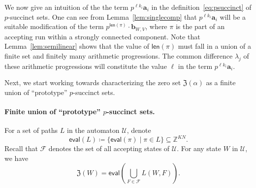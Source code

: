 \documentclass[letterpaper, 11pt, thm-restate]{article}
\numberwithin{equation}{section}
\newcommand{\Z}{\mathbb{Z}}
\newcommand{\mF}{\mathcal{F}}
\newcommand{\mZ}{\mathfrak{Z}}
\newcommand{\ba}{\boldsymbol{a}}
\newcommand{\bb}{\boldsymbol{b}}
\newcommand{\mmU}{\mathscr{U}}
\newcommand{\len}{\mathsf{len}}
\newcommand{\eval}{\mathsf{eval}}
\theoremstyle{definition}
\theoremstyle{definition}
\theoremstyle{definition}
\begin{document}
We now give an intuition of the the term $p^{\ell k_i} \ba_i$ in the definition~\eqref{eq:psuccinct} of $p$-succinct sets.
One can see from Lemma~\ref{lem:singlecomp} that $p^{\ell k_i} \ba_i$ will be a suitable modification of the term $p^{\len(\pi)} \cdot \bb_{W, V}$, where $\pi$ is the part of an accepting run within a strongly connected component.
Note that Lemma~\ref{lem:semilinear} shows that the value of $\len(\pi)$ must fall in a union of a finite set and finitely many arithmetic progressions.
The common difference $\lambda_j$ of these arithmetic progressions will constitute the value $\ell$ in the term $p^{\ell k_i} \ba_i$.

Next, we start working towards characterizing the zero set $\mZ(\alpha)$ as a finite union of ``prototype'' $p$-succinct sets.

\paragraph{Finite union of ``prototype'' $p$-succinct sets.} %
For a set of paths $L$ in the automaton $\mmU$, denote
\[
\eval(L) \coloneqq \{\eval(\pi) \mid \pi \in L\} \subseteq \Z^{KN}.
\]
Recall that $\mF$ denotes the set of all accepting states of $\mmU$. For any state $W$ in $\mmU$, we have
\[
\mZ(W) = \eval\left(\bigcup_{F \in \mF} L(W, F)\right).
\]
\end{document}
